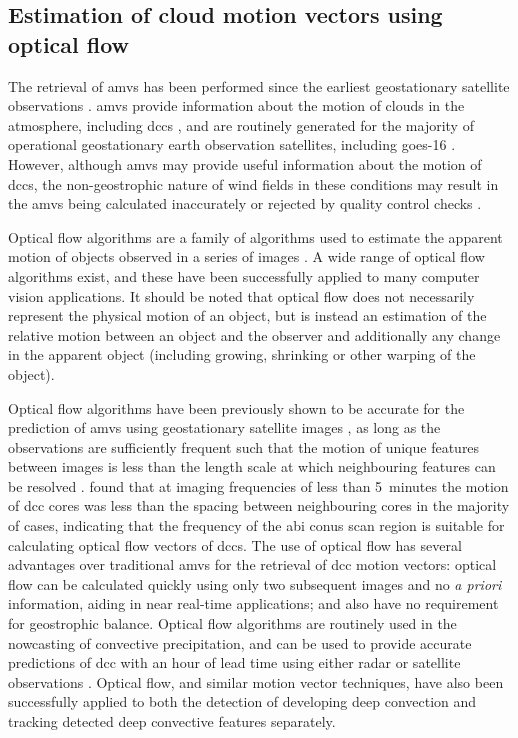 \subsection{Estimation of cloud motion vectors using optical flow}

The retrieval of \acrshort{amv}s has been performed since the earliest geostationary satellite observations \citep{menzel_cloud_2001}.
\acrshort{amv}s provide information about the motion of clouds in the atmosphere, including \acrshort{dcc}s \citep{bedka_application_2005}, and are routinely generated for the majority of operational geostationary earth observation satellites, including \acrshort{goes}-16 \citep{daniels_algorithm_nodate}. 
However, although \acrshort{amv}s may provide useful information about the motion of \acrshort{dcc}s, the non-geostrophic nature of wind fields in these conditions may result in the \acrshort{amv}s being calculated inaccurately or rejected by quality control checks \citep{bedka_application_2005}.

Optical flow algorithms are a family of algorithms used to estimate the apparent motion of objects observed in a series of images \citep{aggarwal_computation_1988}. 
A wide range of optical flow algorithms exist, and these have been successfully applied to many computer vision applications. 
It should be noted that optical flow does not necessarily represent the physical motion of an object, but is instead an estimation of the relative motion between an object and the observer and additionally any change in the apparent object (including growing, shrinking or other warping of the object). 

Optical flow algorithms have been previously shown to be accurate for the prediction of \acrshort{amv}s using geostationary satellite images \citep{wu_deriving_2016}, as long as the observations are sufficiently frequent such that the motion of unique features between images is less than the length scale at which neighbouring features can be resolved \citep{bresky_feasibility_2006}.
\citet{heikenfeld_tobac_2019} found that at imaging frequencies of less than 5~minutes the motion of \acrshort{dcc} cores was less than the spacing between neighbouring cores in the majority of cases, indicating that the frequency of the \acrshort{abi} \acrshort{conus} scan region is suitable for calculating optical flow vectors of \acrshort{dcc}s.
The use of optical flow has several advantages over traditional \acrshort{amv}s for the retrieval of \acrshort{dcc} motion vectors: optical flow can be calculated quickly using only two subsequent images and no \textit{a priori} information, aiding in near real-time applications; and also have no requirement for geostrophic balance. 
Optical flow algorithms are routinely used in the nowcasting of convective precipitation, and can be used to provide accurate predictions of \acrshort{dcc} with an hour of lead time using either radar or satellite observations \citep[e.g.][]{bowler_development_2004, bechini_enhanced_2017, woo_operational_2017}.
Optical flow, and similar motion vector techniques, have also been successfully applied to both the detection of developing deep convection \citep{zinner_cb-tram:_2008, zhang_locating_2014} and tracking detected deep convective features \citep{senf_size-resolved_2018} separately.

